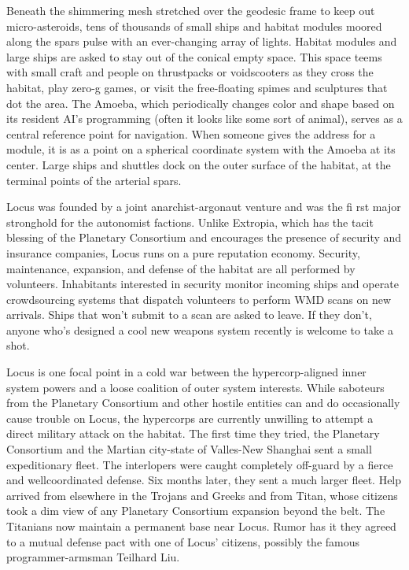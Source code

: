 Beneath the shimmering mesh stretched over the geodesic frame to keep out micro-asteroids, tens of thousands of small ships and habitat modules moored along the spars pulse with an ever-changing array of lights. Habitat modules and large ships are asked to stay out of the conical empty space. This space teems with small craft and people on thrustpacks or voidscooters as they cross the habitat, play zero-g games, or visit the free-floating spimes and sculptures that dot the area. The Amoeba, which periodically changes color and shape based on its resident AI's programming (often it looks like some sort of animal), serves as a central reference point for navigation. When someone gives the address for a module, it is as a point on a spherical coordinate system with the Amoeba at its center. Large ships and shuttles dock on the outer surface of the habitat, at the terminal points of the arterial spars. 

Locus was founded by a joint anarchist-argonaut venture and was the fi rst major stronghold for the autonomist factions. Unlike Extropia, which has the tacit blessing of the Planetary Consortium and encourages the presence of security and insurance companies, Locus runs on a pure reputation economy. Security, maintenance, expansion, and defense of the habitat are all performed by volunteers. Inhabitants interested in security monitor incoming ships and operate crowdsourcing systems that dispatch volunteers to perform WMD scans on new arrivals. Ships that won't submit to a scan are asked to leave. If they don't, anyone who's designed a cool new weapons system recently is welcome to take a shot. 

Locus is one focal point in a cold war between the hypercorp-aligned inner system powers and a loose coalition of outer system interests. While saboteurs from the Planetary Consortium and other hostile entities can and do occasionally cause trouble on Locus, the hypercorps are currently unwilling to attempt a direct military attack on the habitat. The first time they tried, the Planetary Consortium and the Martian city-state of Valles-New Shanghai sent a small expeditionary fleet. The interlopers were caught completely off-guard by a fierce and wellcoordinated defense. Six months later, they sent a much larger fleet. Help arrived from elsewhere in the Trojans and Greeks and from Titan, whose citizens took a dim view of any Planetary Consortium expansion beyond the belt. The Titanians now maintain a permanent base near Locus. Rumor has it they agreed to a mutual defense pact with one of Locus' citizens, possibly the famous programmer-armsman Teilhard Liu. 

